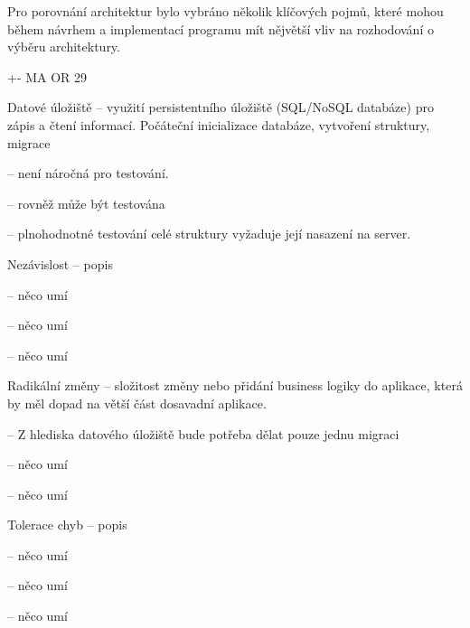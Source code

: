 Pro porovnání architektur bylo vybráno několik klíčových pojmů, které mohou během návrhem a implementací programu mít nějvětší vliv na rozhodování o výběru architektury.

+- MA OR 29


\begin{dl}
   \item[Datové úložiště] – využití persistentního úložiště (SQL/NoSQL databáze) pro zápis a čtení informací.
   Počáteční inicializace databáze, vytvoření struktury, migrace
\end{dl}
\begin{ul}
   \item {} – není náročná pro testování.
   \item {} – rovněž může být testována
   \item {} – plnohodnotné testování celé struktury vyžaduje její nasazení na server.
\end{ul}

\begin{dl}
   \item[Nezávislost] – popis
\end{dl}
\begin{ul}
   \item {} – něco umí
   \item {} – něco umí
   \item {} – něco umí
\end{ul}

\begin{dl}
   \item[Radikální změny] – složitost změny nebo přidání business logiky do aplikace, která by měl dopad na větší část dosavadní aplikace.
\end{dl}
\begin{ul}
   \item {} –
   Z hlediska datového úložiště bude potřeba dělat pouze jednu migraci
   \item {} – něco umí
   \item {} – něco umí
\end{ul}

\begin{dl}
   \item[Tolerace chyb] – popis
\end{dl}
\begin{ul}
   \item {} – něco umí
   \item {} – něco umí
   \item {} – něco umí
\end{ul}

